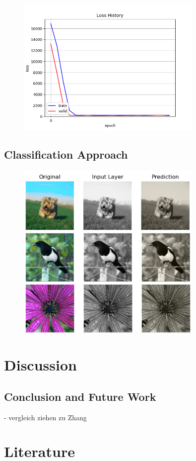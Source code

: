 \documentclass[12pt,letterpaper]{article}
\begin{document}
\begin{figure}[h!]
	\centering
	\includegraphics[width=0.8\textwidth]{loss_classical.png}
	\caption{}
	\label{loss_class}
\end{figure}

\subsection{Classification Approach}
\begin{figure}
	\centering
	\includegraphics[width=0.8\textwidth]{classific_predict.png}
	\caption{}
	\label{class}
\end{figure}

\section{Discussion}

\subsection{Conclusion and Future Work}
- vergleich ziehen zu Zhang\\
\newpage
\thispagestyle{empty}
\section{Literature}
\label{Lit}

\renewcommand{\bibsection}{}


	
\end{document}
